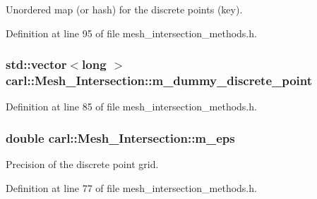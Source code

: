Unordered map (or hash) for the discrete points (key). 



Definition at line 95 of file mesh\+\_\+intersection\+\_\+methods.\+h.

\hypertarget{classcarl_1_1_mesh___intersection_aa84e7b362c2187f100591e5e3fef33e5}{}
\subsubsection[{m\+\_\+dummy\+\_\+discrete\+\_\+point}]{\setlength{\rightskip}{0pt plus 5cm}std\+::vector$<$long $>$ carl\+::\+Mesh\+\_\+\+Intersection\+::m\+\_\+dummy\+\_\+discrete\+\_\+point\hspace{0.3cm}{\ttfamily [protected]}}\label{classcarl_1_1_mesh___intersection_aa84e7b362c2187f100591e5e3fef33e5}


Definition at line 85 of file mesh\+\_\+intersection\+\_\+methods.\+h.

\hypertarget{classcarl_1_1_mesh___intersection_a2b2a46afcfa01b2763315f439bd0a4d6}{}
\subsubsection[{m\+\_\+eps}]{\setlength{\rightskip}{0pt plus 5cm}double carl\+::\+Mesh\+\_\+\+Intersection\+::m\+\_\+eps\hspace{0.3cm}{\ttfamily [protected]}}\label{classcarl_1_1_mesh___intersection_a2b2a46afcfa01b2763315f439bd0a4d6}


Precision of the discrete point grid. 



Definition at line 77 of file mesh\+\_\+intersection\+\_\+methods.\+h.

\hypertarget{classcarl_1_1_mesh___intersection_abe420c1736bc43ea710f2f92073e91b9}{}
